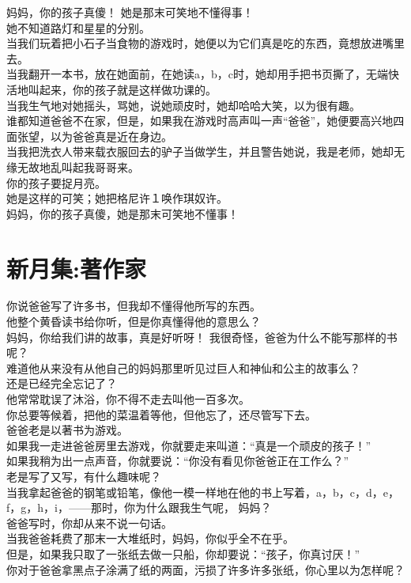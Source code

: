 \documentclass[]{book}
\renewenvironment{quote}{\begin{VF}}{\end{VF}}
\begin{document}
\begin{quote}
妈妈，你的孩子真傻！ 她是那末可笑地不懂得事！\\
她不知道路灯和星星的分别。\\
当我们玩着把小石子当食物的游戏时，她便以为它们真是吃的东西，竟想放进嘴里去。\\
当我翻开一本书，放在她面前，在她读a，b，c时，她却用手把书页撕了，无端快活地叫起来，你的孩子就是这样做功课的。\\
当我生气地对她摇头，骂她，说她顽皮时，她却哈哈大笑，以为很有趣。\\
谁都知道爸爸不在家，但是，如果我在游戏时高声叫一声``爸爸''，她便要高兴地四面张望，以为爸爸真是近在身边。\\
当我把洗衣人带来载衣服回去的驴子当做学生，并且警告她说，我是老师，她却无缘无故地乱叫起我哥哥来。\\
你的孩子要捉月亮。\\
她是这样的可笑；她把格尼许１唤作琪奴许。\\
妈妈，你的孩子真傻，她是那末可笑地不懂事！
\end{quote}

\section{新月集:著作家}

\begin{quote}
你说爸爸写了许多书，但我却不懂得他所写的东西。\\
他整个黄昏读书给你听，但是你真懂得他的意思么？\\
妈妈，你给我们讲的故事，真是好听呀！
我很奇怪，爸爸为什么不能写那样的书呢？\\
难道他从来没有从他自己的妈妈那里听见过巨人和神仙和公主的故事么？\\
还是已经完全忘记了？\\
他常常耽误了沐浴，你不得不走去叫他一百多次。\\
你总要等候着，把他的菜温着等他，但他忘了，还尽管写下去。\\
爸爸老是以著书为游戏。\\
如果我一走进爸爸房里去游戏，你就要走来叫道：``真是一个顽皮的孩子！''\\
如果我稍为出一点声音，你就要说：``你没有看见你爸爸正在工作么？''\\
老是写了又写，有什么趣味呢？\\
当我拿起爸爸的钢笔或铅笔，像他一模一样地在他的书上写着，a，b，c，d，e，f，g，h，i，------那时，你为什么跟我生气呢，
妈妈？\\
爸爸写时，你却从来不说一句话。\\
当我爸爸耗费了那末一大堆纸时，妈妈，你似乎全不在乎。\\
但是，如果我只取了一张纸去做一只船，你却要说：``孩子，你真讨厌！''\\
你对于爸爸拿黑点子涂满了纸的两面，污损了许多许多张纸，你心里以为怎样呢？
\end{quote}
\end{document}
